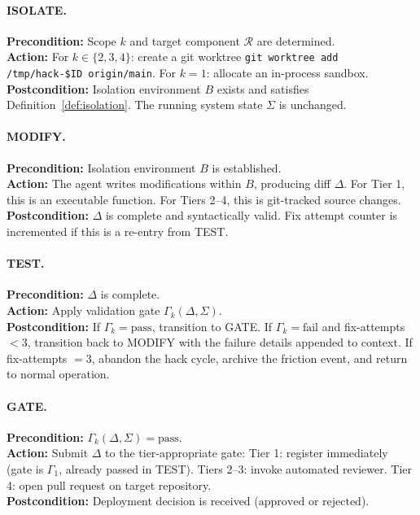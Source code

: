 \paragraph{ISOLATE.}
\textbf{Precondition:} Scope $k$ and target component $\mathcal{R}$ are
determined. \\
\textbf{Action:} For $k \in \{2, 3, 4\}$: create a git worktree
\texttt{git worktree add /tmp/hack-\$ID origin/main}. For $k = 1$: allocate
an in-process sandbox. \\
\textbf{Postcondition:} Isolation environment $B$ exists and satisfies
Definition~\ref{def:isolation}. The running system state $\Sigma$ is unchanged.

\paragraph{MODIFY.}
\textbf{Precondition:} Isolation environment $B$ is established. \\
\textbf{Action:} The agent writes modifications within $B$, producing diff
$\Delta$. For Tier 1, this is an executable function. For Tiers 2--4, this is
git-tracked source changes. \\
\textbf{Postcondition:} $\Delta$ is complete and syntactically valid. Fix
attempt counter is incremented if this is a re-entry from TEST.

\paragraph{TEST.}
\textbf{Precondition:} $\Delta$ is complete. \\
\textbf{Action:} Apply validation gate $\Gamma_k(\Delta, \Sigma)$. \\
\textbf{Postcondition:} If $\Gamma_k = \text{pass}$, transition to GATE.
If $\Gamma_k = \text{fail}$ and fix-attempts $< 3$, transition back to MODIFY
with the failure details appended to context. If fix-attempts $= 3$, abandon
the hack cycle, archive the friction event, and return to normal operation.

\paragraph{GATE.}
\textbf{Precondition:} $\Gamma_k(\Delta, \Sigma) = \text{pass}$. \\
\textbf{Action:} Submit $\Delta$ to the tier-appropriate gate:
Tier 1: register immediately (gate is $\Gamma_1$, already passed in TEST).
Tiers 2--3: invoke automated reviewer.
Tier 4: open pull request on target repository. \\
\textbf{Postcondition:} Deployment decision is received ($\text{approved}$ or
$\text{rejected}$).

